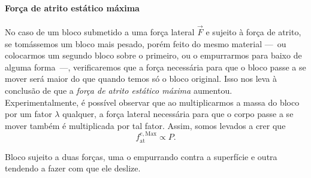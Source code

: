 \paragraph{Força de atrito estático máxima} 

No caso de um bloco submetido a uma força lateral $\vec{F}$ e sujeito à força de atrito, se tomássemos um bloco mais pesado, porém feito do mesmo material ---~ou colocarmos um segundo bloco sobre o primeiro, ou o empurrarmos para baixo de alguma forma~---, verificaremos que a força necessária para que o bloco passe a se mover será maior do que quando temos só o bloco original. Isso nos leva à conclusão de que a \emph{força de atrito estático máxima} aumentou. Experimentalmente, é possível observar que ao multiplicarmos a massa do bloco por um fator $\lambda$ qualquer, a força lateral necessária para que o corpo passe a se mover também é multiplicada por tal fator. Assim, somos levados a crer que 
\begin{equation}
     f_{\text{at}}^{e,\textrm{Max}} \propto P.
\end{equation}

\begin{marginfigure}
\centering
{}
\caption{Bloco sujeito a duas forças, uma o empurrando contra a superfície e outra tendendo a fazer com que ele deslize.\label{Fig:BlocoEmpurradoParaBaixo}}
\end{marginfigure}

